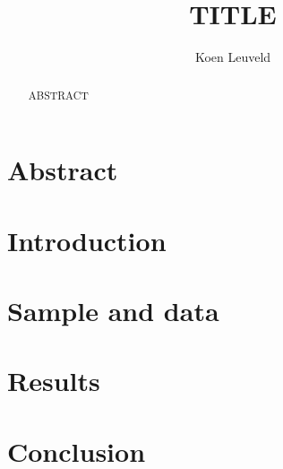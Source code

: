 \documentclass[11pt,a4paper]{scrartcl} %
\begin{document}

\author{Koen Leuveld}




\title{TITLE}

\maketitle


\section*{Abstract}
\begin{abstract}
ABSTRACT
\end{abstract}


\section*{Introduction}



\section*{Sample and data}


\section*{Results}


\section*{Conclusion}


\clearpage 





\end{document}
